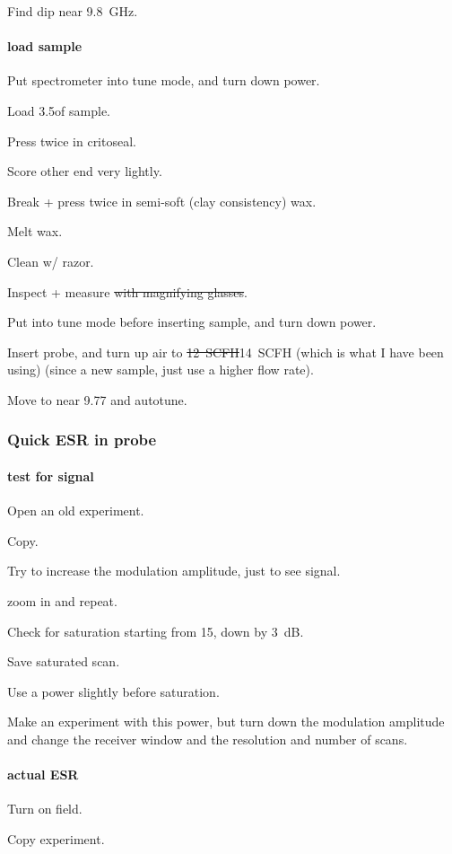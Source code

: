Find dip near 9.8~GHz.

\paragraph{load sample}
Put spectrometer into tune mode, and turn down power.

Load 3.5\uL of sample.

Press twice in critoseal.

Score other end very lightly.

Break + press twice in semi-soft (clay consistency) wax.

Melt wax.

Clean w/ razor.

Inspect + measure\sout{ with magnifying glasses}.

Put into tune mode before inserting sample, and turn down power.

Insert probe, and turn up air to \sout{12~SCFH}14~SCFH (which is what I have been using) (since a new sample, just use a higher flow rate).

Move to near 9.77 and autotune.

\subsubsection{Quick ESR in probe}
\paragraph{test for signal}
Open an old experiment.

Copy.

Try to increase the modulation amplitude, just to see signal.

zoom in and repeat.

Check for saturation starting from 15, down by 3~dB.

Save saturated scan.

Use a power slightly before saturation.

Make an experiment with this power, but turn down the modulation amplitude and change the receiver window and the resolution and number of scans.

\paragraph{actual ESR}
Turn on field.

Copy experiment.

